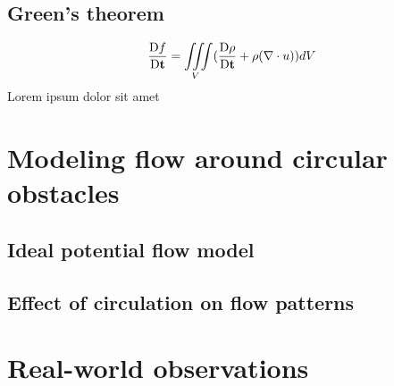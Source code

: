 \subsection*{Green's theorem}\label{sec:greenstheorem}
\begin{equation} %
	\materialder{f}{\mathbf{t}}=\iiint\limits_{V}(\materialder{\rho}{\mathbf{t}}+\rho(\nabla\cdot u))dV
\end{equation}
Lorem ipsum dolor sit amet \cite{peyret2012computational}

\section{Modeling flow around circular obstacles}
\subsection{Ideal potential flow model}
\subsection{Effect of circulation on flow patterns}
\section{Real-world observations}